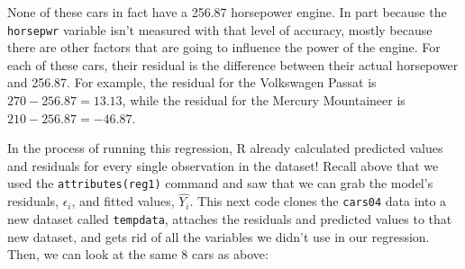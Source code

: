 \documentclass[
  letterpaper,
]{book}
\newenvironment{Shaded}{\begin{snugshade}}{\end{snugshade}}
\newcommand{\DecValTok}[1]{\textcolor[rgb]{0.68,0.00,0.00}{#1}}
\newcommand{\FunctionTok}[1]{\textcolor[rgb]{0.28,0.35,0.67}{#1}}
\newcommand{\NormalTok}[1]{\textcolor[rgb]{0.00,0.23,0.31}{#1}}
\newcommand{\OtherTok}[1]{\textcolor[rgb]{0.00,0.23,0.31}{#1}}
\newcommand{\SpecialCharTok}[1]{\textcolor[rgb]{0.37,0.37,0.37}{#1}}
\begin{document}
None of these cars in fact have a 256.87 horsepower engine. In part
because the \texttt{horsepwr} variable isn't measured with that level of
accuracy, mostly because there are other factors that are going to
influence the power of the engine. For each of these cars, their
residual is the difference between their actual horsepower and 256.87.
For example, the residual for the Volkswagen Passat is
\(270-256.87=13.13\), while the residual for the Mercury Mountaineer is
\(210-256.87=-46.87\).

In the process of running this regression, R already calculated
predicted values and residuals for every single observation in the
dataset! Recall above that we used the \texttt{attributes(reg1)} command
and saw that we can grab the model's residuals, \(\epsilon_i\), and
fitted values, \(\hat{Y_i}\). This next code clones the \texttt{cars04}
data into a new dataset called \texttt{tempdata}, attaches the residuals
and predicted values to that new dataset, and gets rid of all the
variables we didn't use in our regression. Then, we can look at the same
8 cars as above:

\begin{Shaded}
\end{Shaded}
\end{document}
